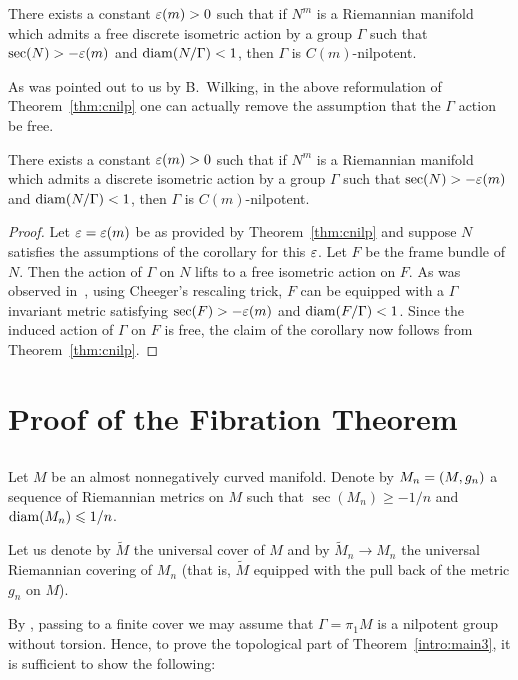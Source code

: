 \documentclass{amsart}
\begin{document}
There exists a constant $\varepsilon(m)>0$ such that if $N^m$  is a Riemannian manifold which admits a free discrete isometric action by a  group $\Gamma$
such that $\sec(N)\z> -\eps(m)$ and $\operatorname{\rm diam}(N/\Gamma)<1$,
then $\Gamma$ is $C(m)$-nilpotent.


As was pointed out to us by B.~Wilking,
in the above reformulation of Theorem~\ref{thm:cnilp}
one can actually remove the assumption
that the $\Gamma$ action be free.

\begin{cor}\label{cor:nonfree}
There exists a constant $\varepsilon(m)>0$ such that
if $N^m$  is a Riemannian manifold
which admits a discrete  isometric action by a  group $\Gamma$
such that $\sec(N)> -\varepsilon(m)$ and $\operatorname{\rm diam}(N/\Gamma)<1$,
then $\Gamma$ is $C(m)$-nilpotent.
\end{cor}
\begin{proof}
Let $\varepsilon=\varepsilon(m)$ be as provided by Theorem~\ref{thm:cnilp}
and suppose $N$ satisfies the assumptions of the corollary for this $\varepsilon$.
Let $F$ be the frame bundle of $N$.
Then the action of $\Gamma$ on $N$ lifts to a free isometric action on $F$.
As was observed in~\cite{FY},
using Cheeger's rescaling trick,
$F$ can be equipped with a $\Gamma$ invariant metric
satisfying $\sec(F)>-\varepsilon(m)$ and $\operatorname{\rm diam}(F/\Gamma)<1$.
Since the induced action of $\Gamma$ on $F$ is free,
the claim of the corollary now follows from Theorem~\ref{thm:cnilp}.
\end{proof}




\section{Proof of the Fibration Theorem}\label{sec:fib}
\subsection{} Let $M$ be an almost nonnegatively curved manifold.
Denote by $M_n\z=(M,g_n)$
a sequence of Riemannian metrics on $M$ such that $\sec(M_n)\ge -1/n$
and $\operatorname{\rm diam}(M_n)\leqslant 1/n$.

Let us denote by $\tilde M$ the universal cover of $M$ and by
$\tilde M_n\to M_n$
the universal Riemannian covering of $M_n$
(that is, $\tilde M$ equipped with the pull back of the metric $g_n$ on $M$).

By \cite{FY}, passing to a finite cover
we may assume that $\Gamma=\pi_1M$ is a nilpotent group without torsion.
Hence, to prove the topological part of Theorem~\ref{intro:main3},
it is sufficient to show the following:
\end{document}
